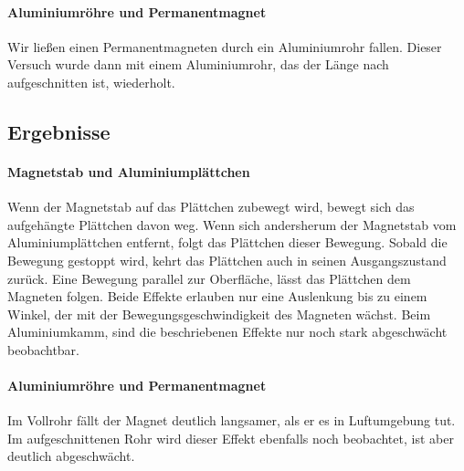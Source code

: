 \documentclass[
	a4paper,
	12pt,
	pagesize,
	ngerman
]{scrartcl}
\begin{document}
	\paragraph{Aluminiumröhre und Permanentmagnet}
	Wir ließen einen Permanentmagneten durch ein Aluminiumrohr fallen. Dieser Versuch wurde dann mit einem Aluminiumrohr, das der Länge nach aufgeschnitten ist, wiederholt.
	\subsection{Ergebnisse}
	\paragraph{Magnetstab und Aluminiumplättchen}
	Wenn der Magnetstab auf das Plättchen zubewegt wird, bewegt sich das aufgehängte Plättchen davon weg. Wenn sich andersherum der Magnetstab vom Aluminiumplättchen entfernt, folgt das Plättchen dieser Bewegung. Sobald die Bewegung gestoppt wird, kehrt das Plättchen auch in seinen Ausgangszustand zurück. Eine Bewegung parallel zur Oberfläche, lässt das Plättchen dem Magneten folgen. Beide Effekte erlauben nur eine Auslenkung bis zu einem Winkel, der mit der Bewegungsgeschwindigkeit des Magneten wächst. %
	Beim Aluminiumkamm, sind die beschriebenen Effekte nur noch stark abgeschwächt beobachtbar.
	\paragraph{Aluminiumröhre und Permanentmagnet}
	Im Vollrohr fällt der Magnet deutlich langsamer, als er es in Luftumgebung tut. Im aufgeschnittenen Rohr wird dieser Effekt ebenfalls noch beobachtet, ist aber deutlich abgeschwächt.
\end{document}

